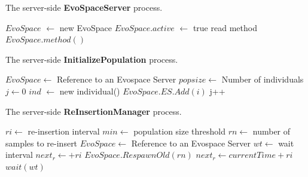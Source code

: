 \begin{algorithm}[t]
\caption{The server-side \textbf{EvoSpaceServer} process.}
\begin{algorithmic}
\STATE $EvoSpace$ $\leftarrow$ new EvoSpace
\STATE $EvoSpace.active$ $\leftarrow$ true
\STATE read method
\RETURN $EvoSpace.method()$
\ENDWHILE
\end{algorithmic}
\label{alg:evoserver}
\end{algorithm}


\begin{algorithm}[t]
\caption{The server-side \textbf{InitializePopulation} process.}
\begin{algorithmic}
\REQUIRE $EvoSpace \leftarrow$ Reference to an Evospace Server
\REQUIRE $popsize \leftarrow$ Number of individuals
\STATE $j \leftarrow 0$
\STATE $ind$ $\leftarrow$ new individual() 
\STATE $EvoSpace.ES.Add(i)$
\STATE j++
\ENDFOR
\end{algorithmic}
\label{alg:population}
\end{algorithm}

\begin{algorithm}[t]
\caption{The server-side \textbf{ReInsertionManager} process.}
\begin{algorithmic}
\REQUIRE $ri \leftarrow$ re-insertion interval
\REQUIRE $min \leftarrow$ population size threshold
\REQUIRE $rn \leftarrow$ number of samples to re-insert
\REQUIRE $EvoSpace \leftarrow$ Reference to an Evospace Server
\REQUIRE $wt \leftarrow$ wait interval
\STATE $next_r \leftarrow +ri$
\STATE $EvoSpace.RespawnOld(rn)$
\STATE $next_r \leftarrow currentTime + ri$
\ENDIF
\STATE $wait(wt)$
\ENDWHILE
\end{algorithmic}
\label{alg:remanager}
\end{algorithm}


